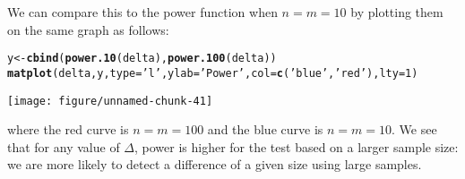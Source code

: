 \documentclass[addpoints,12pt]{exam}\usepackage[]{graphicx}\usepackage[]{color}
\makeatletter
\def\maxwidth{ %
  \ifdim\Gin@nat@width>\linewidth
    \linewidth
  \else
    \Gin@nat@width
  \fi
}
\newcommand{\hlnum}[1]{\textcolor[rgb]{0.686,0.059,0.569}{#1}}%
\newcommand{\hlstr}[1]{\textcolor[rgb]{0.192,0.494,0.8}{#1}}%
\newcommand{\hlstd}[1]{\textcolor[rgb]{0.345,0.345,0.345}{#1}}%
\newcommand{\hlkwb}[1]{\textcolor[rgb]{0.69,0.353,0.396}{#1}}%
\newcommand{\hlkwc}[1]{\textcolor[rgb]{0.333,0.667,0.333}{#1}}%
\newcommand{\hlkwd}[1]{\textcolor[rgb]{0.737,0.353,0.396}{\textbf{#1}}}%
\newenvironment{kframe}{%
 \def\at@end@of@kframe{}%
 \ifinner\ifhmode%
  \def\at@end@of@kframe{\end{minipage}}%
  \begin{minipage}{\columnwidth}%
 \fi\fi%
 \def\FrameCommand##1{\hskip\@totalleftmargin \hskip-\fboxsep
 \colorbox{shadecolor}{##1}\hskip-\fboxsep
     \hskip-\linewidth \hskip-\@totalleftmargin \hskip\columnwidth}%
 \MakeFramed {\advance\hsize-\width
   \@totalleftmargin\z@ \linewidth\hsize
   \@setminipage}}%
 {\par\unskip\endMakeFramed%
 \at@end@of@kframe}
\newenvironment{knitrout}{}{} %
\makeatother
\begin{document}
\begin{questions}
\begin{parts}
\begin{solution}
\begin{knitrout}
\begin{kframe}
\end{kframe}
\end{knitrout}
We can compare this to the power function when $n=m=10$ by plotting them on the same graph as follows:
\begin{knitrout}
\color{fgcolor}\begin{kframe}
\begin{alltt}
\hlstd{y} \hlkwb{<-} \hlkwd{cbind}\hlstd{(}\hlkwd{power.10}\hlstd{(delta),} \hlkwd{power.100}\hlstd{(delta))}
\hlkwd{matplot}\hlstd{(delta, y,} \hlkwc{type} \hlstd{=} \hlstr{'l'}\hlstd{,} \hlkwc{ylab} \hlstd{=} \hlstr{'Power'}\hlstd{,} \hlkwc{col} \hlstd{=} \hlkwd{c}\hlstd{(}\hlstr{'blue'}\hlstd{,} \hlstr{'red'}\hlstd{),} \hlkwc{lty} \hlstd{=} \hlnum{1}\hlstd{)}
\end{alltt}
\end{kframe}

{\centering \texttt{[image: figure/unnamed-chunk-41]} 

}



\end{knitrout}
where the red curve is $n = m = 100$ and the blue curve is $n=m=10$. We see that for any value of $\Delta$, power is higher for the test based on a larger sample size: we are more likely to detect a difference of a given size using large samples. 


\end{solution}
\end{parts}
\end{questions}
\end{document}
